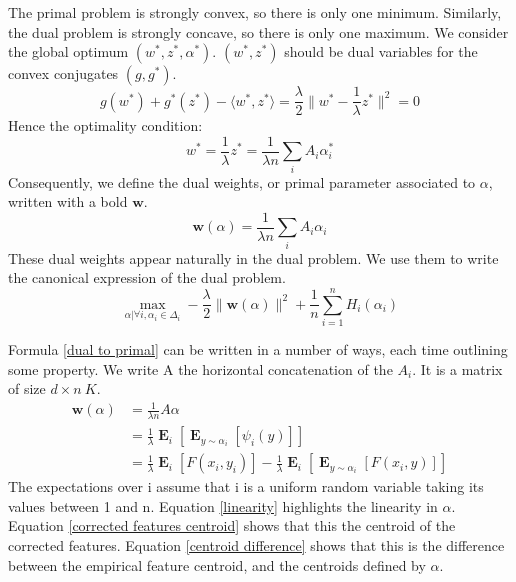\documentclass{article}
\DeclareMathOperator{\1}{\mathbb{1}}
\DeclareMathOperator{\E}{\mathbf{E}}
\begin{document}
The primal problem is strongly convex, so there is only one minimum.
Similarly, the dual problem is strongly concave, so there is only one maximum.
We consider the global optimum $(w^*,z^*,\alpha^*)$.
$(w^*,z^*)$ should be dual variables for the convex conjugates $(g, g^*)$.
\begin{equation*}
	g(w^*) + g^*(z^*) - \langle w^*, z^* \rangle = \frac{\lambda}{2} \| w^* - \frac{1}{\lambda} z^* \|^2 = 0
\end{equation*}
Hence the optimality condition:
\begin{equation*}
	w^* = 	\frac{1}{\lambda} z^* =  \frac{1}{\lambda n} \sum_i A_i \alpha_i^*
\end{equation*}
Consequently, we define the dual weights, or primal parameter associated to $\alpha$, written with a bold $\bm w$.
\begin{equation}
	\label{dual to primal}
	\bm w(\alpha) =   \frac{1}{\lambda n} \sum_i A_i \alpha_i
\end{equation}
These dual weights appear naturally in the dual problem. We use them to write the canonical expression of the dual problem.
\begin{equation}
	\label{dual problem}
	\max_{\alpha | \forall i, \alpha_i \in \Delta_i} -\frac{\lambda}{2} \| \bm w(\alpha) \|^2 + \frac{1}{n} \sum_{i=1}^n H_i(\alpha_i)
\end{equation}

Formula \ref{dual to primal} can be written in a number of ways, each time outlining some property.
We write A the horizontal concatenation of the $A_i$.
It is a matrix of size $d \times n\ K$.
\begin{align}
	\bm w(\alpha) & = \frac{1}{\lambda n} A \alpha \label{linearity} \\
	 & = \frac{1}{\lambda} \E_{i} [ \E_{y \sim \alpha_i} [\psi_i(y)]] \label{corrected features centroid} \\
	 & =   \frac{1}{\lambda} \E_{i} [F(x_i, y_i)] - \frac{1}{\lambda} \E_{i} [ \E_{y \sim \alpha_i} [F(x_i, y)]]
	 \label{centroid difference}
\end{align}
The expectations over i assume that i is a uniform random variable taking its values between 1 and n. 
Equation \ref{linearity} highlights the linearity in $\alpha$. Equation \ref{corrected features centroid} shows that this the centroid of the corrected features. Equation \ref{centroid difference} shows that this is the difference between the empirical feature centroid, and the centroids defined by $\alpha$.
\end{document}

